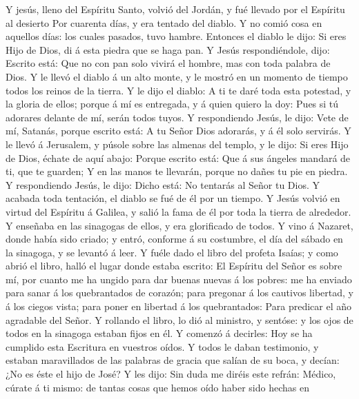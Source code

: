  Y jesús, lleno del Espíritu Santo, volvió del Jordán, y fué
llevado por el Espíritu al desierto  Por cuarenta días, y
era tentado del diablo. Y no comió cosa en aquellos días: los cuales
pasados, tuvo hambre.  Entonces el diablo le dijo: Si eres
Hijo de Dios, di á esta piedra que se haga pan.  Y Jesús
respondiéndole, dijo: Escrito está: Que no con pan solo vivirá el
hombre, mas con toda palabra de Dios.  Y le llevó el diablo
á un alto monte, y le mostró en un momento de tiempo todos los reinos de
la tierra.  Y le dijo el diablo: A ti te daré toda esta
potestad, y la gloria de ellos; porque á mí es entregada, y á quien
quiero la doy:  Pues si tú adorares delante de mí, serán
todos tuyos.  Y respondiendo Jesús, le dijo: Vete de mí,
Satanás, porque escrito está: A tu Señor Dios adorarás, y á él solo
servirás.  Y le llevó á Jerusalem, y púsole sobre las
almenas del templo, y le dijo: Si eres Hijo de Dios, échate de aquí
abajo:  Porque escrito está: Que á sus ángeles mandará de
ti, que te guarden;  Y en las manos te llevarán, porque no
dañes tu pie en piedra.  Y respondiendo Jesús, le dijo:
Dicho está: No tentarás al Señor tu Dios.  Y acabada toda
tentación, el diablo se fué de él por un tiempo.  Y Jesús
volvió en virtud del Espíritu á Galilea, y salió la fama de él por toda
la tierra de alrededor.  Y enseñaba en las sinagogas de
ellos, y era glorificado de todos.  Y vino á Nazaret, donde
había sido criado; y entró, conforme á su costumbre, el día del sábado
en la sinagoga, y se levantó á leer.  Y fuéle dado el libro
del profeta Isaías; y como abrió el libro, halló el lugar donde estaba
escrito:  El Espíritu del Señor es sobre mí, por cuanto me
ha ungido para dar buenas nuevas á los pobres: me ha enviado para sanar
á los quebrantados de corazón; para pregonar á los cautivos libertad, y
á los ciegos vista; para poner en libertad á los quebrantados:
 Para predicar el año agradable del Señor.  Y
rollando el libro, lo dió al ministro, y sentóse: y los ojos de todos en
la sinagoga estaban fijos en él.  Y comenzó á decirles: Hoy
se ha cumplido esta Escritura en vuestros oídos.  Y todos
le daban testimonio, y estaban maravillados de las palabras de gracia
que salían de su boca, y decían: ¿No es éste el hijo de José?
 Y les dijo: Sin duda me diréis este refrán: Médico, cúrate
á ti mismo: de tantas cosas que hemos oído haber sido hechas en
